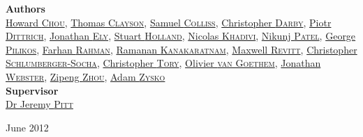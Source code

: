 \begin{titlepage}
\begin{center}
\textbf{Authors}\\
\vspace{5pt}
\href{mailto:howard.chou09@imperial.ac.uk}{Howard \textsc{Chou}}, 
\href{mailto:thomas.clayson08@imperial.ac.uk}{Thomas \textsc{Clayson}},
\href{mailto:samuel.colliss09@imperial.ac.uk}{Samuel \textsc{Colliss}}, 
\href{mailto:christopher.darby08@imperial.ac.uk}{Christopher \textsc{Darby}}, 
\href{mailto:piotr.dittrich09@imperial.ac.uk}{Piotr \textsc{Dittrich}}, 
\href{mailto:jonathan.ely09@imperial.ac.uk}{Jonathan \textsc{Ely}}, 
\href{mailto:stuart.holland09@imperial.ac.uk}{Stuart \textsc{Holland}}, 
\href{mailto:nicolas.khadivi09@imperial.ac.uk}{Nicolas \textsc{Khadivi}}, 
\href{mailto:nikunj.patel09@imperial.ac.uk}{Nikunj \textsc{Patel}},
\href{mailto:george.pilikos08@imperial.ac.uk}{George \textsc{Pilikos}}, 
\href{mailto:farhan.rahman09@imperial.ac.uk}{Farhan \textsc{Rahman}}, 
\href{mailto:kanakaratnam.ramanan09@imperial.ac.uk}{Ramanan \textsc{Kanakaratnam}}, 
\href{mailto:maxwell.revitt09@imperial.ac.uk}{Maxwell \textsc{Revitt}}, 
\href{mailto:chris.socha09@imperial.ac.uk}{Christopher \textsc{Schlumberger-Socha}}, 
\href{mailto:christopher.tory09@imperial.ac.uk}{Christopher \textsc{Tory}}, 
\href{mailto:olivier.van-goethem09@imperial.ac.uk}{Olivier \textsc{van Goethem}}, 
\href{mailto:jonathan.webster08@imperial.ac.uk}{Jonathan \textsc{Webster}}, 
\href{mailto:zipeng.zhou08@imperial.ac.uk}{Zipeng \textsc{Zhou}}, 
\href{mailto:adam.zysko09@imperial.ac.uk}{Adam \textsc{Zysko}} \\ \vfill
\textbf{Supervisor} \\
\vspace{5pt}
\href{mailto:j.pitt@imperial.ac.uk}{Dr Jeremy \textsc{Pitt}}


\vfill

{\large June 2012}

\end{center}
\end{titlepage}

